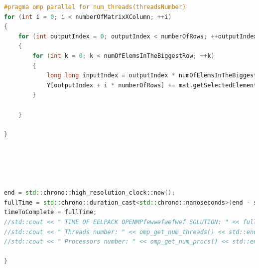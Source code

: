 \documentclass{scrreprt}
\begin{document}
\begin{lstlisting}[language=C++, caption=OpenMP.cpp]
#pragma omp parallel for num_threads(threadsNumber)
for (int i = 0; i < numberOfMatrixXColumn; ++i)
{
	for (int outputIndex = 0; outputIndex < numberOfRows; ++outputIndex)
	{
		for (int k = 0; k < numOfElemsInTheBiggestRow; ++k)
		{
			long long inputIndex = outputIndex * numOfElemsInTheBiggestRow + k;
			Y[outputIndex + i * numberOfRows] += mat.getSelectedElementAS(inputIndex) * X[mat.getSelectedElementJA(inputIndex) + i * numberOfRows] ;
		}

	}	

}





end = std::chrono::high_resolution_clock::now();
fullTime = std::chrono::duration_cast<std::chrono::nanoseconds>(end - start).count() / 1000000.0;
timeToComplete = fullTime;
//std::cout << " TIME OF EELPACK OPENMPfewwefwefwef SOLUTION: " << fullTime << std::endl;
//std::cout << " Threads number: " << omp_get_num_threads() << std::endl;
//std::cout << " Processors number: " << omp_get_num_procs() << std::endl;

}






\end{lstlisting}
\end{document}
